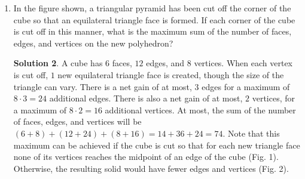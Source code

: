 \documentclass{article}
\theoremstyle{definition}
\newtheorem*{solution}{Solution}
\begin{document}
\begin{multicols}{2}
\begin{enumerate}
        Express your answer as a common fraction in terms of $\pi$.
        \begin{solution}
            The diameter of the sphere is equal to the side length $s$ of the cube.
            The volume of the cube $s^3$, and the volume of the sphere is $\frac{s^3}{\frac{\pi s^3}{6}} = \frac{6}{\pi}$.
            Note that because the sphere is inside the cube, the ratio has to be greater than $1$, of course.
            It is interesting that the ratio is almost $2$ (because $\pi \approx 3.1$), meaning the sphere takes up only a little more than half the space inside the cube.
        \end{solution}
        \item In the figure shown, a triangular pyramid has been cut off the corner of the cube so that an equilateral triangle face is formed.
        If each corner of the cube is cut off in this manner, what is the maximum sum of the number of faces, edges, and vertices on the new polyhedron?
        \begin{center}
        \end{center}
        \begin{solution}
            A cube has $6$ faces, $12$ edges, and $8$ vertices. When each vertex is cut off, $1$ new equilateral triangle face is created, though the size of the triangle can vary.
            There is a net gain of at most, $3$ edges for a maximum of $8 \cdot 3 = 24$ additional edges.
            There is also a net gain of at most, $2$ vertices, for a maximum of $8 \cdot 2 = 16$ additional vertices.
            At most, the sum of the number of faces, edges, and vertices will be $(6 + 8) + (12 + 24) + (8 + 16) = 14 + 36 +24 = 74$.
            Note that this maximum can be achieved if the cube is cut so that for each new triangle face none of its vertices reaches the midpoint of an edge of the cube (Fig. 1).
            Otherwise, the resulting solid would have fewer edges and vertices (Fig. 2).
            \begin{center}

\end{center}
\end{solution}
\end{enumerate}
\end{multicols}
\end{document}
